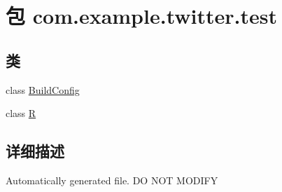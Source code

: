 \hypertarget{namespacecom_1_1example_1_1twitter_1_1test}{}\section{包 com.\+example.\+twitter.\+test}
\label{namespacecom_1_1example_1_1twitter_1_1test}
\subsection*{类}
\begin{DoxyCompactItemize}
\item 
class \mbox{\hyperlink{classcom_1_1example_1_1twitter_1_1test_1_1_build_config}{Build\+Config}}
\item 
class \mbox{\hyperlink{classcom_1_1example_1_1twitter_1_1test_1_1_r}{R}}
\end{DoxyCompactItemize}


\subsection{详细描述}
Automatically generated file. DO N\+OT M\+O\+D\+I\+FY 